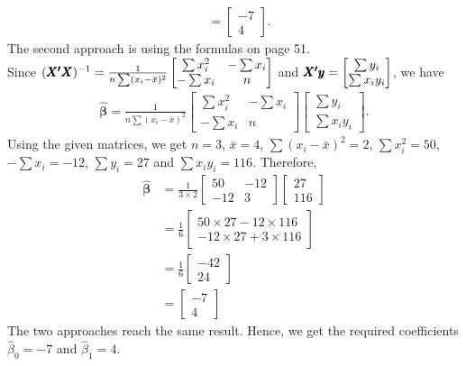 \documentclass[10pt]{article}
\begin{document}
\begin{enumerate}[1)]
\begin{align*}
&=
  \begin{bmatrix}
    -7\\
    4
  \end{bmatrix}
.
\end{align*}
The second approach is using the formulas on page 51.\\
Since $(\pmb{X\textsuperscript{$\prime$}}\pmb{X})^{-1}=\frac{1}{n\sum(x_i-\bar{x})^2}
  \begin{bmatrix}
    \sum{x_i^2} & -\sum{x_i}\\
    -\sum{x_i} & n
  \end{bmatrix}
$
and $\pmb{X\textsuperscript{$\prime$}}\pmb{y}=
  \begin{bmatrix}
    \sum{y_i}\\
    \sum{x_i y_i}
  \end{bmatrix}
$, we have
\begin{align*}
\pmb{\hat{\beta}}=\frac{1}{n\sum(x_i-\bar{x})^2}
  \begin{bmatrix}
    \sum{x_i^2} & -\sum{x_i}\\
    -\sum{x_i} & n
  \end{bmatrix}
  \begin{bmatrix}
    \sum{y_i}\\
    \sum{x_i y_i}
  \end{bmatrix}
.
\end{align*}
Using the given matrices, we get $n=3$, $\bar{x}=4$, $\sum(x_i-\bar{x})^2=2$, $\sum{x^2_i}=50$, $-\sum{x_i}=-12$, $\sum{y_i}=27$ and $\sum{x_i y_i}=116$. Therefore,
\begin{align*}
\pmb{\hat{\beta}}&=\frac{1}{3\times2}
  \begin{bmatrix}
    50 & -12\\
    -12 & 3
  \end{bmatrix}
  \begin{bmatrix}
    27\\
    116
  \end{bmatrix}
\\
&=\frac{1}{6}
  \begin{bmatrix}
    50\times27-12\times116\\
    -12\times27+3\times116
  \end{bmatrix}
\\
&=\frac{1}{6}
  \begin{bmatrix}
    -42\\
    24
  \end{bmatrix}
\\
&=
  \begin{bmatrix}
    -7\\
    4
  \end{bmatrix}
\end{align*}
The two approaches reach the same result. Hence, we get the required coefficients $\hat{\beta}_0=-7$ and $\hat{\beta}_1=4$.


\end{enumerate}
\end{document}

